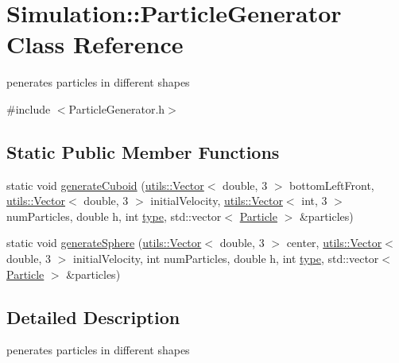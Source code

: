 \hypertarget{classSimulation_1_1ParticleGenerator}{\section{Simulation\-:\-:Particle\-Generator Class Reference}
\label{classSimulation_1_1ParticleGenerator}
}


penerates particles in different shapes  




{\ttfamily \#include $<$Particle\-Generator.\-h$>$}

\subsection*{Static Public Member Functions}
\begin{DoxyCompactItemize}
\item 
static void \hyperlink{classSimulation_1_1ParticleGenerator_a8fb7273c9b825209540396c1cbacf574}{generate\-Cuboid} (\hyperlink{classutils_1_1Vector}{utils\-::\-Vector}$<$ double, 3 $>$ bottom\-Left\-Front, \hyperlink{classutils_1_1Vector}{utils\-::\-Vector}$<$ double, 3 $>$ initial\-Velocity, \hyperlink{classutils_1_1Vector}{utils\-::\-Vector}$<$ int, 3 $>$ num\-Particles, double h, int \hyperlink{classtype}{type}, std\-::vector$<$ \hyperlink{classSimulation_1_1Particle}{Particle} $>$ \&particles)
\item 
static void \hyperlink{classSimulation_1_1ParticleGenerator_a1726b3093c82abebf17baf580e5137f4}{generate\-Sphere} (\hyperlink{classutils_1_1Vector}{utils\-::\-Vector}$<$ double, 3 $>$ center, \hyperlink{classutils_1_1Vector}{utils\-::\-Vector}$<$ double, 3 $>$ initial\-Velocity, int num\-Particles, double h, int \hyperlink{classtype}{type}, std\-::vector$<$ \hyperlink{classSimulation_1_1Particle}{Particle} $>$ \&particles)
\end{DoxyCompactItemize}


\subsection{Detailed Description}
penerates particles in different shapes 

